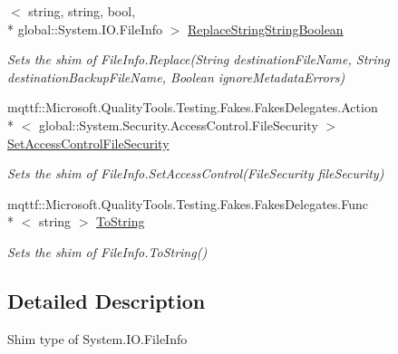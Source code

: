 \begin{DoxyCompactItemize}
$<$ string, string, bool, \\*
global\-::\-System.\-I\-O.\-File\-Info $>$ \hyperlink{class_system_1_1_i_o_1_1_fakes_1_1_shim_file_info_ab0d67c7ffd5326972a106c59588336d5}{Replace\-String\-String\-Boolean}
\begin{DoxyCompactList}\small\item\em Sets the shim of File\-Info.\-Replace(\-String destination\-File\-Name, String destination\-Backup\-File\-Name, Boolean ignore\-Metadata\-Errors)\end{DoxyCompactList}\item 
mqttf\-::\-Microsoft.\-Quality\-Tools.\-Testing.\-Fakes.\-Fakes\-Delegates.\-Action\\*
$<$ global\-::\-System.\-Security.\-Access\-Control.\-File\-Security $>$ \hyperlink{class_system_1_1_i_o_1_1_fakes_1_1_shim_file_info_af18b0e2cbc3a948d003da3a05f6a282f}{Set\-Access\-Control\-File\-Security}
\begin{DoxyCompactList}\small\item\em Sets the shim of File\-Info.\-Set\-Access\-Control(\-File\-Security file\-Security)\end{DoxyCompactList}\item 
mqttf\-::\-Microsoft.\-Quality\-Tools.\-Testing.\-Fakes.\-Fakes\-Delegates.\-Func\\*
$<$ string $>$ \hyperlink{class_system_1_1_i_o_1_1_fakes_1_1_shim_file_info_a89c3875fe47c8c626a43b6f6d878ad20}{To\-String}
\begin{DoxyCompactList}\small\item\em Sets the shim of File\-Info.\-To\-String()\end{DoxyCompactList}\end{DoxyCompactItemize}


\subsection{Detailed Description}
Shim type of System.\-I\-O.\-File\-Info



